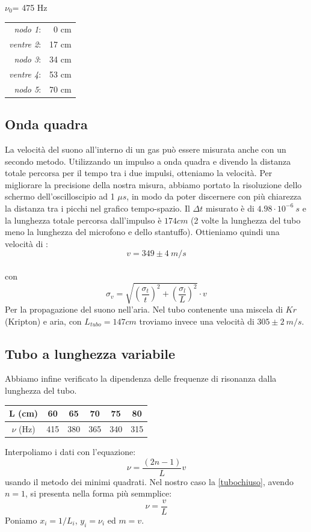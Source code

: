 \begin{center}
$\nu_0$= 475 Hz\\
\begin{tabular}{r r}
\textit{nodo 1}: & 0 cm\\
\textit{ventre 2}: & 17 cm\\
\textit{nodo 3}: & 34 cm\\
\textit{ventre 4}: & 53 cm\\
\textit{nodo 5}: & 70 cm\\
\end{tabular}
\end{center}

\subsection{Onda quadra}
La velocità del suono all'interno di un gas può essere misurata anche con un secondo metodo. Utilizzando un impulso a onda quadra e divendo la distanza totale percorsa per il tempo tra i due impulsi, otteniamo la velocità.  Per migliorare la precisione della nostra misura, abbiamo portato la risoluzione dello schermo dell'oscilloscipio ad 1 $\mu s$, in modo da poter discernere con più chiarezza la distanza tra i picchi nel grafico tempo-spazio.
Il $\Delta t$ misurato è di $4.98 \cdot 10^{-6} \ s$ e la lunghezza totale percorsa dall'impulso è $174 cm$ (2 volte la lunghezza del tubo meno la lunghezza del microfono e dello stantuffo). Ottieniamo quindi una velocità di :
$$v = 349 \pm 4 \ m/s$$
\\
con $$\sigma_v=\sqrt{\left(\frac{\sigma_t}{t}\right)^2+\left(\frac{\sigma_l}{L} \right)^2} \cdot v$$
Per la propagazione del suono nell'aria. Nel tubo contenente una miscela di $Kr$ (Kripton) e aria, con $L_{tubo} = 147 cm$ troviamo invece una velocità di $305 \pm 2\ m/s$. 

\subsection{Tubo a lunghezza variabile}
Abbiamo infine verificato la dipendenza delle frequenze di risonanza dalla lunghezza del tubo.

\begin{center}
\begin{tabular}{*{5}{c|}c}
L (cm) & 60 & 65 & 70 & 75 & 80 \\
\midrule
$\nu$ (Hz) &415 & 380 & 365 & 340 & 315\\
\end{tabular}
\end{center}
Interpoliamo i dati con l'equazione:
\begin{equation}\label{tubochiuso}
\nu=\frac{(2n-1)}{L}v
\end{equation} 
usando il metodo dei minimi quadrati. Nel nostro caso la \ref{tubochiuso}, avendo $n=1$, si presenta nella forma più semmplice:
$$\nu=\frac{v}{L}$$
Poniamo $x_i=1/L_i$, $y_i=\nu_i$ ed $m=v$.

